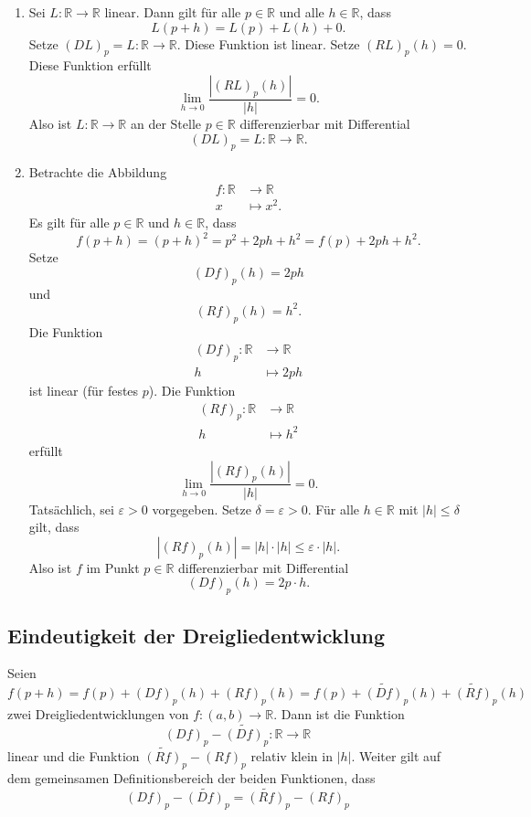\documentclass[../main.tex]{subfiles}
\begin{document}
\begin{examples}
  \leavevmode
  \begin{enumerate}[(1)]
    \item Sei $L \colon \mathbb{R} \to \mathbb{R}$
      linear.
      Dann gilt für alle $p \in \mathbb{R}$ und alle
      $h \in \mathbb{R}$, dass
      \[
        L(p + h) = L(p) + L(h) + 0.
      \]
      Setze ${(DL)}_p = L \colon \mathbb{R} \to \mathbb{R}$.
      Diese Funktion ist linear. Setze
      ${(RL)}_p(h) = 0$. Diese Funktion erfüllt
      \[
        \lim_{h \to 0} \frac{|{(RL)}_p(h)|}{|h|} = 0.
      \]
      Also ist $L \colon \mathbb{R} \to \mathbb{R}$
      an der Stelle $p \in \mathbb{R}$
      differenzierbar mit Differential
      \[
      {(DL)}_p = L \colon \mathbb{R} \to \mathbb{R}.
      \]
    \item Betrachte die Abbildung
      \begin{align*}
        f \colon \mathbb{R} & \to \mathbb{R} \\
        x & \mapsto x^2.
      \end{align*}
      Es gilt für alle $p \in \mathbb{R}$ und
      $h \in \mathbb{R}$, dass
      \[
        f( p + h ) = {(p + h)}^2
        = p^2 + 2ph + h^2
        = f(p) + 2ph + h^2.
      \]
      Setze
      \[
        {(Df)}_p(h) = 2ph
      \]
      und
      \[
        {(Rf)}_p(h) = h^2.
      \]
      Die Funktion
      \begin{align*}
        {(Df)}_p \colon \mathbb{R} & \to \mathbb{R} \\
        h & \mapsto 2ph
      \end{align*}
      ist linear (für festes $p$).
      Die Funktion
      \begin{align*}
        {(Rf)}_p \colon \mathbb{R} & \to \mathbb{R} \\
        h & \mapsto h^2
      \end{align*}
      erfüllt
      \[
        \lim_{h \to 0} \frac{|{(Rf)}_p(h)|}{|h|} = 0.
      \]
      Tatsächlich, sei $\varepsilon > 0$ vorgegeben.
      Setze $\delta = \varepsilon > 0$.
      Für alle $h \in \mathbb{R}$ mit $|h| \leq \delta$ gilt,
      dass
      \[
        |{(Rf)}_p(h)| = |h| \cdot |h| \leq \varepsilon \cdot |h|.
      \]
      Also ist $f$ im Punkt $p \in \mathbb{R}$ differenzierbar
      mit Differential
      \[
        {(Df)}_p(h) = 2p \cdot h.
      \]
  \end{enumerate}
\end{examples}

\subsection*{Eindeutigkeit der Dreigliedentwicklung}
Seien
\[
  f(p + h) = f(p) + {(Df)}_p(h) + {(Rf)}_p(h)
  = f(p) + \widetilde{{(Df)}}_p(h) + \widetilde{{(Rf)}}_p(h)
\]
zwei Dreigliedentwicklungen von $f \colon (a, b) \to \mathbb{R}$.
Dann ist die Funktion
\[
{(Df)}_p - \widetilde{{(Df)}}_p \colon \mathbb{R} \to \mathbb{R}
\]
linear und die Funktion
$
  \widetilde{{(Rf)}}_p- {(Rf)}_p
$
relativ klein in $|h|$.
Weiter gilt auf dem gemeinsamen Definitionsbereich der
beiden Funktionen, dass
\[
{(Df)}_p - \widetilde{{(Df)}}_p
  =  \widetilde{{(Rf)}}_p-{(Rf)}_p
\]
\end{document}
